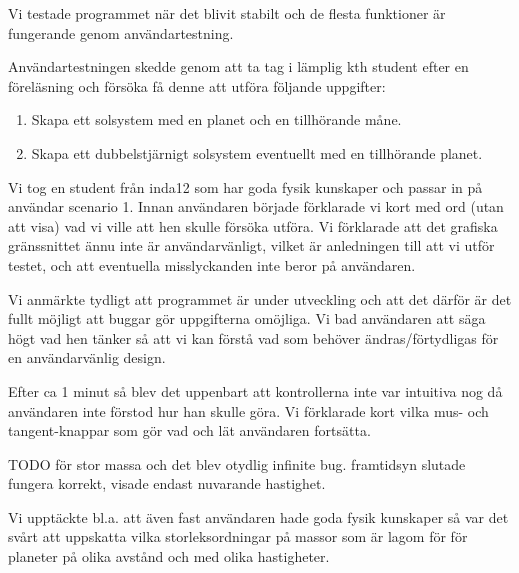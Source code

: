 Vi testade programmet när det blivit stabilt och de flesta funktioner
är fungerande genom användartestning.

Användartestningen skedde genom att ta tag i lämplig kth student efter
en föreläsning och försöka få denne att utföra följande uppgifter:
\begin{enumerate}
    \item Skapa ett solsystem med en planet och en tillhörande måne.
    \item Skapa ett dubbelstjärnigt solsystem eventuellt med
        en tillhörande planet.
\end{enumerate}

Vi tog en student från inda12 som har goda fysik kunskaper
och passar in på användar scenario 1.
Innan användaren började förklarade vi kort med ord (utan att visa)
vad vi ville att hen skulle försöka utföra.
Vi förklarade att det grafiska gränssnittet ännu inte är användarvänligt,
vilket är anledningen till att vi utför testet, och att eventuella
misslyckanden inte beror på användaren.

Vi anmärkte tydligt att programmet är under utveckling och
att det därför är det fullt möjligt att buggar gör uppgifterna omöjliga.
Vi bad användaren att säga högt vad hen tänker så att vi kan förstå vad som
behöver ändras/förtydligas för en användarvänlig design.

Efter ca 1 minut så blev det uppenbart att kontrollerna inte var
intuitiva nog då användaren inte förstod hur han skulle göra.
Vi förklarade kort vilka mus- och tangent-knappar som gör vad och
lät användaren fortsätta.

TODO
för stor massa och det blev otydlig infinite bug.
framtidsyn slutade fungera korrekt, visade endast nuvarande hastighet.

Vi upptäckte bl.a. att även fast användaren hade goda fysik kunskaper så
var det svårt att uppskatta vilka storleksordningar på massor som är
lagom för för planeter på olika avstånd och med olika hastigheter.




